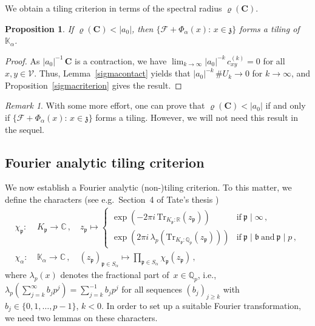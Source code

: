 \documentclass[12pt]{amsart}
\newtheorem{proposition}[lemma]{Proposition}
\theoremstyle{definition}
\theoremstyle{remark}
\newtheorem{remark}[lemma]{Remark}
\numberwithin{equation}{section}
\begin{document}
We obtain a tiling criterion in terms of the spectral radius $\varrho(\mathbf{C})$.

\begin{proposition} \label{p:48}
If $\varrho(\mathbf{C}) < |a_0|$, then $\{\mathcal{F} + \Phi_\alpha(x):\, x \in \mathfrak{z}\}$ forms a tiling of~$\mathbb{K}_\alpha$.
\end{proposition}

\begin{proof}
As $|a_0|^{-1}\, \mathbf{C}$ is a contraction, we have $\lim_{k\to\infty} |a_0|^{-k}\, c_{x y}^{(k)} = 0$ for all $x, y \in \mathcal{V}$.
Thus, Lemma~\ref{sigmacontact} yields that $|a_0|^{-k}\, \#U_k \to 0$ for $k \to \infty$, and Proposition~\ref{sigmacriterion} gives the result.
\end{proof}

\begin{remark} \label{r:effort}
With some more effort, one can prove that $\varrho(\mathbf{C}) < |a_0|$ if and only if $\{\mathcal{F} + \Phi_\alpha(x):\, x \in \mathfrak{z}\}$ forms a tiling.
However, we will not need this result in the sequel.
\end{remark}

\subsection*{Fourier analytic tiling criterion} 
We now establish a Fourier analytic (non-)tiling criterion.
To this matter, we define the characters (see e.g.\ Section~4 of Tate's thesis \cite{Tate:67})
\begin{align*}
\chi_\mathfrak{p}: &\ K_\mathfrak{p} \to \mathbb{C}\,, \quad z_\mathfrak{p} \mapsto \left\{\begin{array}{ll}\exp(-2\pi i\, \mathrm{Tr}_{K_\mathfrak{p}:\mathbb{R}}(z_\mathfrak{p})) & \mbox{if}\ \mathfrak{p} \mid \infty\,, \\[.5ex] \exp(2 \pi i\, \lambda_p(\mathrm{Tr}_{K_\mathfrak{p}:\mathbb{Q}_p}(z_\mathfrak{p}))) & \mbox{if}\ \mathfrak{p} \mid \mathfrak{b}\ \mbox{and}\ \mathfrak{p} \mid p\,, \end{array}\right. \\[.5ex]
\chi_\alpha: &\ \mathbb{K}_\alpha \to \mathbb{C}\,,  \quad (z_\mathfrak{p})_{\mathfrak{p}\in S_\alpha} \mapsto \prod_{\mathfrak{p} \in S_\alpha} \chi_\mathfrak{p}(z_\mathfrak{p})\,,
\end{align*}
where $\lambda_p(x)$ denotes the fractional part of~$x \in \mathbb{Q}_p$, i.e., $\lambda_p(\sum_{j=k}^\infty b_j p^j) = \sum_{j=k}^{-1} b_j p^j$ for all sequences $(b_j)_{j\ge k}$ with $b_j \in \{0,1,\ldots,p-1\}$, $k < 0$.
In order to set up a suitable Fourier transformation, we need two lemmas on these characters.
\end{document}

